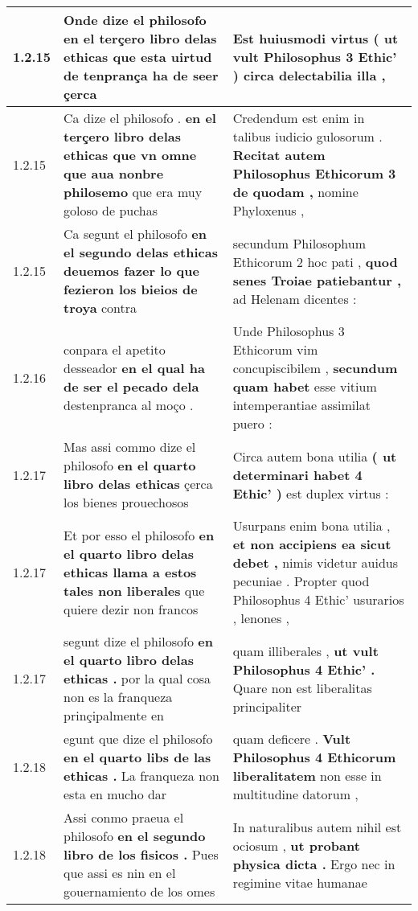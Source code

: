 \begin{tabular}{|p{1cm}|p{6.5cm}|p{6.5cm}|}
1.2.15 & Onde dize el philosofo \textbf{ en el terçero libro delas ethicas } que esta uirtud de tenprança ha de seer çerca & Est huiusmodi virtus \textbf{ ( ut vult Philosophus 3 Ethic’ ) } circa delectabilia illa , \\\hline
1.2.15 & Ca dize el philosofo . \textbf{ en el terçero libro delas ethicas que vn omne que aua nonbre philosemo } que era muy goloso de puchas & Credendum est enim in talibus iudicio gulosorum . \textbf{ Recitat autem Philosophus Ethicorum 3 de quodam , } nomine Phyloxenus , \\\hline
1.2.15 & Ca segunt el philosofo \textbf{ en el segundo delas ethicas deuemos fazer lo que fezieron los bieios de troya } contra & secundum Philosophum Ethicorum 2 hoc pati , \textbf{ quod senes Troiae patiebantur , } ad Helenam dicentes : \\\hline
1.2.16 & conpara el apetito desseador \textbf{ en el qual ha de ser el pecado dela } destenpranca al moço . & Unde Philosophus 3 Ethicorum vim concupiscibilem , \textbf{ secundum quam habet } esse vitium intemperantiae assimilat puero : \\\hline
1.2.17 & Mas assi commo dize el philosofo \textbf{ en el quarto libro delas ethicas } çerca los bienes prouechosos & Circa autem bona utilia \textbf{ ( ut determinari habet 4 Ethic’ ) } est duplex virtus : \\\hline
1.2.17 & Et por esso el philosofo \textbf{ en el quarto libro delas ethicas llama a estos tales non liberales } que quiere dezir non francos & Usurpans enim bona utilia , \textbf{ et non accipiens ea sicut debet , } nimis videtur auidus pecuniae . Propter quod Philosophus 4 Ethic’ usurarios , lenones , \\\hline
1.2.17 & segunt dize el philosofo \textbf{ en el quarto libro delas ethicas . } por la qual cosa non es la franqueza prinçipalmente en & quam illiberales , \textbf{ ut vult Philosophus 4 Ethic’ . } Quare non est liberalitas principaliter \\\hline
1.2.18 & egunt que dize el philosofo \textbf{ en el quarto libs de las ethicas . } La franqueza non esta en mucho dar & quam deficere . \textbf{ Vult Philosophus 4 Ethicorum liberalitatem } non esse in multitudine datorum , \\\hline
1.2.18 & Assi conmo praeua el philosofo \textbf{ en el segundo libro de los fisicos . } Pues que assi es nin en el gouernamiento de los omes & In naturalibus autem nihil est ociosum , \textbf{ ut probant physica dicta . } Ergo nec in regimine vitae humanae \\\hline

\end{tabular}
